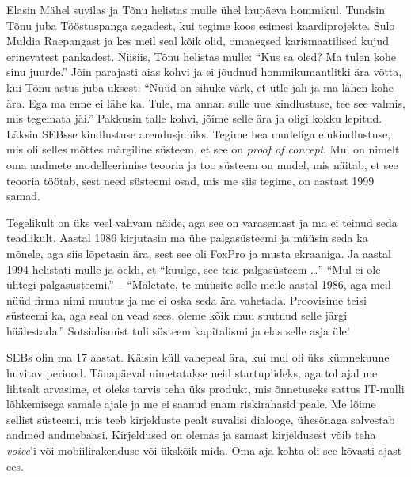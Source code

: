 Elasin Mähel suvilas ja Tõnu helistas mulle ühel laupäeva hommikul. Tundsin Tõnu 
juba Tööstuspanga aegadest, kui tegime koos esimesi kaardiprojekte. 
Sulo Muldia Raepangast ja kes meil seal kõik olid, omaaegsed 
karismaatilised kujud erinevatest pankadest. Niisiis, Tõnu helistas mulle: \enquote{Kus sa oled? Ma tulen kohe sinu juurde.} Jõin parajasti aias kohvi ja ei jõudnud hommikumantlitki ära võtta, kui
Tõnu astus juba uksest: \enquote{Nüüd on sihuke värk, et 
ütle jah ja ma lähen kohe ära. Ega ma enne ei lähe ka. Tule, ma annan 
sulle uue kindlustuse, tee see valmis, mis tegemata jäi.} Pakkusin talle kohvi, 
jõime selle ära ja oligi kokku lepitud. Läksin SEBsse kindlustuse 
arendusjuhiks. Tegime hea mudeliga elukindlustuse, mis oli 
selles mõttes märgiline süsteem, et see on \emph{proof of concept}. 
Mul on nimelt oma andmete modelleerimise teooria ja too süsteem on mudel, mis 
näitab, et see teooria töötab, sest need süsteemi osad, mis me siis tegime, on 
aastast 1999 samad. 


Tegelikult on üks veel vahvam näide, aga see on varasemast ja ma ei teinud seda 
teadlikult. Aastal 1986 kirjutasin ma ühe palgasüsteemi ja müüsin seda ka 
mõnele, aga siis lõpetasin ära, sest see oli FoxPro ja musta ekraaniga. Ja aastal 1994 
helistati mulle ja öeldi, et \enquote{kuulge, see teie palgasüsteem \ldots} 
\enquote{Mul ei ole ühtegi palgasüsteemi.} -- \enquote{Mäletate, te müüsite selle meile aastal 1986, aga meil nüüd firma nimi muutus ja me ei oska seda ära vahetada. Proovisime
teisi süsteemi ka, aga seal on vead sees, oleme kõik muu suutnud selle järgi 
häälestada.} Sotsialismist tuli süsteem kapitalismi ja elas selle asja üle! 


SEBs olin ma 17 aastat. Käisin küll 
vahepeal ära, kui mul oli üks kümnekuune huvitav periood. Tänapäeval nimetatakse 
neid \mbox{startup}'ideks, aga tol ajal me lihtsalt arvasime, et oleks tarvis teha üks 
produkt, mis õnnetuseks sattus IT-mulli lõhkemisega samale ajale ja me ei 
saanud enam riskirahasid peale. Me lõime sellist süsteemi, mis teeb kirjelduste 
pealt suvalisi dialooge, ühesõnaga salvestab andmed andmebaasi. 
Kirjeldused on olemas ja samast kirjeldusest võib teha \emph{voice}'i või 
mobiilirakenduse või ükskõik mida. Oma aja kohta 
oli see kõvasti ajast ees.

